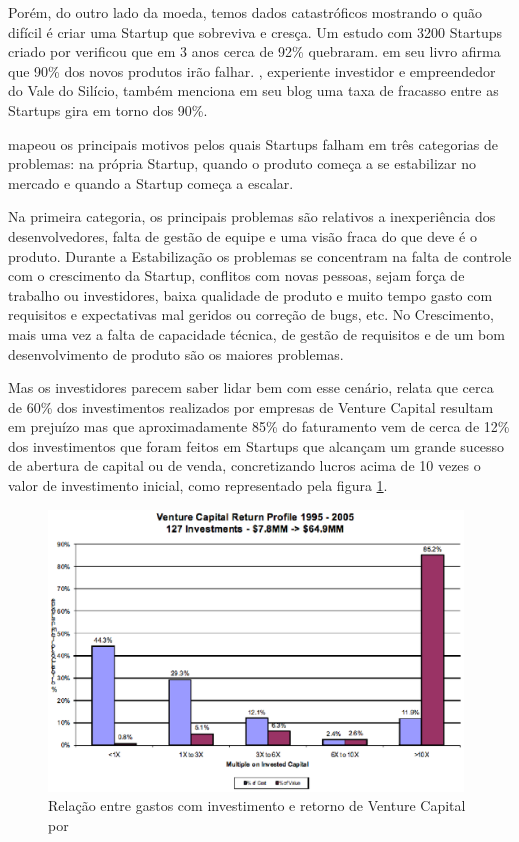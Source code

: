 Porém, do outro lado da moeda, temos dados catastróficos mostrando o quão difícil é criar uma Startup que sobreviva e cresça. Um estudo com 3200 Startups criado por  verificou que em 3 anos cerca de 92\% quebraram.  em seu livro afirma que 90\% dos novos produtos irão falhar. , experiente investidor e empreendedor do Vale do Silício, também menciona em seu blog uma taxa de fracasso entre as Startups gira em torno dos 90\%. 

 mapeou os principais motivos pelos quais Startups falham em três categorias de problemas: na própria Startup, quando o produto começa a se estabilizar no mercado e quando a Startup começa a escalar.

Na primeira categoria, os principais problemas são relativos a inexperiência dos desenvolvedores, falta de gestão de equipe e uma visão fraca do que deve é o produto. Durante a Estabilização os problemas se concentram na falta de controle com o crescimento da Startup, conflitos com novas pessoas, sejam força de trabalho ou investidores, baixa qualidade de produto e muito tempo gasto com requisitos e expectativas mal geridos ou correção de bugs, etc. No Crescimento, mais uma vez a falta de capacidade técnica, de gestão de requisitos e de um bom desenvolvimento de produto são os maiores problemas.

Mas os investidores parecem saber lidar bem com esse cenário,  relata que cerca de 60\% dos investimentos realizados por empresas de Venture Capital resultam em prejuízo mas que aproximadamente 85\% do faturamento vem de cerca de 12\% dos investimentos que foram feitos em Startups que alcançam um grande sucesso de abertura de capital ou de venda, concretizando lucros acima de 10 vezes o valor de investimento inicial, como representado pela figura \ref{figure:venture_cpaital_profits}. 

\begin{figure}[!htb]
\centering
\includegraphics[width=11cm,angle=0]{figuras/venture_capital_profits}
\caption{Relação entre gastos com investimento e retorno de Venture Capital por \cite{Sahlman2010}}
\label{figure:venture_cpaital_profits}
\end{figure}

